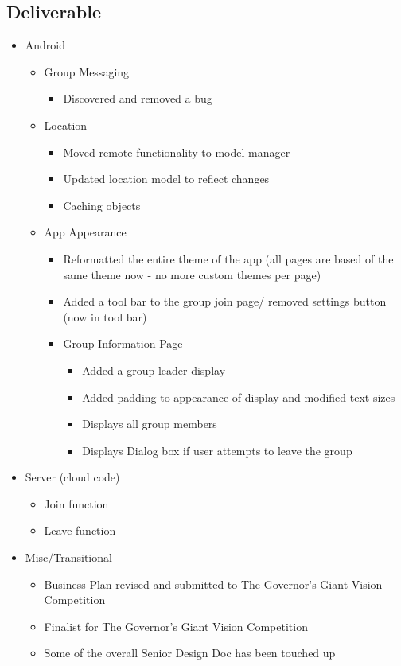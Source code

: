 \subsection{Deliverable}
\begin{itemize}
	\item Android
	\begin{itemize}
		\item Group Messaging
		\begin{itemize}
			\item Discovered and removed a bug
		\end{itemize}
	\item Location
	\begin{itemize}
		\item Moved remote functionality to model manager
		\item Updated location model to reflect changes
		\item Caching objects
	\end{itemize}
		\item App Appearance
		\begin{itemize}
			\item Reformatted the entire theme of the app (all pages are based of the same theme now - no more custom themes per page)
			\item Added a tool bar to the group join page/ removed settings button (now in tool bar)
			\item Group Information Page
			\begin{itemize}
				\item Added a group leader display
				\item Added padding to appearance of display and modified text sizes
				\item Displays all group members
				\item Displays Dialog box if user attempts to leave the group
			\end{itemize}
		\end{itemize}
	\end{itemize}
	\item Server (cloud code)
	\begin{itemize}
		\item Join function
		\item Leave function
	\end{itemize}
	\item Misc/Transitional
	\begin{itemize}
		\item Business Plan revised and submitted to The Governor's Giant Vision Competition
		\item Finalist for The Governor's Giant Vision Competition
		\item Some of the overall Senior Design Doc has been touched up
	\end{itemize}
\end{itemize}
